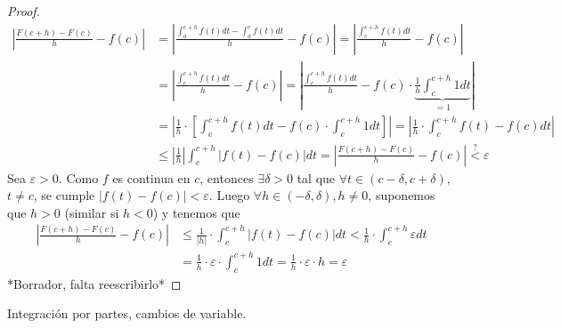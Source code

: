 \begin{proof}
	\begin{align*}
		\left\vert \frac{F(c+h) - F(c)}{h} - f(c) \right\vert & = \left\vert \frac{\int^{c+h}_a f(t )dt  - \int^{c}_a f(t) dt }{h} - f(c) \right\vert = \left\vert \frac{\int^{c+h}_c f(t) dt }{h} - f(c) \right\vert                                        \\
		                                                      & = \left\vert \frac{\int^{c +h}_c f(t) dt }{h} - f(c ) \right\vert = \left\vert \frac{\int^{c + h}_c f(t)dt }{h} - f(c) \cdot \underbrace{\frac{1}{h} \int^{c +h}_{c} 1 dt }_{=1} \right\vert \\ & = \left\vert \frac{1}{h} \cdot \left [ \int^{c + h}_c f(t) dt - f(c) \cdot \int^{c + h}_{c} 1 dt   \right ] \right\vert = \left\vert \frac{1}{h} \cdot \int^{c +h}_c f(t) - f(c) dt   \right\vert \\ & \leq \left\vert \frac{1}{h } \right\vert \int^{c + h}_{c} \left\vert f(t) - f(c ) \right\vert dt = \left\vert \frac{F(c + h ) - F(c)}{h} - f(c) \right\vert  \overset{?}{<} \varepsilon
	\end{align*}
	Sea \(\varepsilon > 0 \). Como \(f \) es continua en \(c \), entonces \(\exists \delta > 0 \) tal que \(\forall t \in (c - \delta, c + \delta)\), \(t \neq c\), se cumple \(\left\vert f(t) - f(c ) \right\vert < \varepsilon\). Luego \(\forall h \in (- \delta, \delta ), h \neq 0\), suponemos que \(h > 0 \) (similar si \(h < 0 \)) y tenemos que    
	\begin{align*}
		\left\vert \frac{F(c + h) - F(c )}{h} - f(c) \right\vert & \leq \frac{1}{\left\vert h  \right\vert } \cdot \int^{c + h}_c \left\vert f(t) - f(c ) \right\vert dt < \frac{1}{h} \cdot \int^{c + h}_c \varepsilon dt \\ & =  \frac{1}{h} \cdot \varepsilon \cdot \int^{c + h}_c 1 dt = \frac{1}{h} \cdot \varepsilon \cdot h = \varepsilon 
	\end{align*}
	*Borrador, falta reescribirlo*
\end{proof}

Integración por partes, cambios de variable.